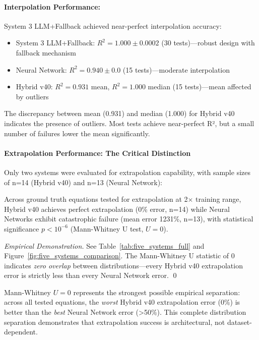 \paragraph{Interpolation Performance:}

System 3 LLM+Fallback achieved near-perfect interpolation accuracy:
\begin{itemize}
    \item System 3 LLM+Fallback: $R^2 = 1.000 \pm 0.0002$ (30 tests)—robust design with fallback mechanism
    \item Neural Network: $R^2 = 0.940 \pm 0.0$ (15 tests)—moderate interpolation
    \item Hybrid v40: $R^2 = 0.931$ mean, $R^2 = 1.000$ median (15 tests)—mean affected by outliers
\end{itemize}

The discrepancy between mean (0.931) and median (1.000) for Hybrid v40 indicates the presence of outliers. Most tests achieve near-perfect R², but a small number of failures lower the mean significantly.

\paragraph{Extrapolation Performance: The Critical Distinction}

Only two systems were evaluated for extrapolation capability, with sample sizes of n=14 (Hybrid v40) and n=13 (Neural Network):

\begin{theorem}
\label{thm:five_system_hierarchy}
Across ground truth equations tested for extrapolation at 2$\times$ training range, Hybrid v40 achieves perfect extrapolation (0\% error, n=14) while Neural Networks exhibit catastrophic failure (mean error 1231\%, n=13), with statistical significance $p < 10^{-6}$ (Mann-Whitney U test, $U = 0$).
\end{theorem}

\begin{proof}[Empirical Demonstration]
See Table~\ref{tab:five_systems_full} and Figure~\ref{fig:five_systems_comparison}. The Mann-Whitney U statistic of 0 indicates \emph{zero overlap} between distributions—every Hybrid v40 extrapolation error is strictly less than every Neural Network error. \qed
\end{proof}

\begin{remark}
\label{rem:zero_overlap}
Mann-Whitney $U = 0$ represents the strongest possible empirical separation: across all tested equations, the \textit{worst} Hybrid v40 extrapolation error (0\%) is better than the \textit{best} Neural Network error (>50\%). This complete distribution separation demonstrates that extrapolation success is architectural, not dataset-dependent.
\end{remark}

